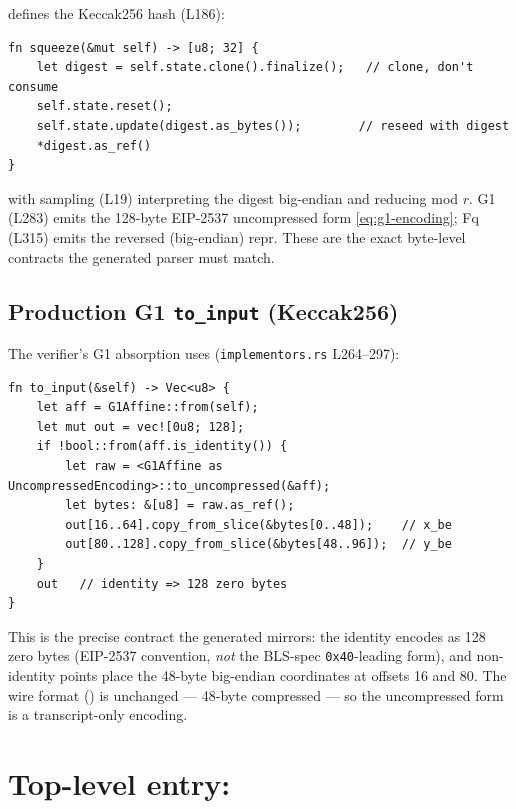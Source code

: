  defines the Keccak256 hash (L186):
\begin{lstlisting}[style=rust]
fn squeeze(&mut self) -> [u8; 32] {
    let digest = self.state.clone().finalize();   // clone, don't consume
    self.state.reset();
    self.state.update(digest.as_bytes());        // reseed with digest
    *digest.as_ref()
}
\end{lstlisting}
with sampling  (L19) interpreting
the digest big-endian and reducing mod $r$. G1  (L283)
emits the 128-byte EIP-2537 uncompressed form \eqref{eq:g1-encoding};
Fq  (L315) emits the reversed (big-endian) repr. These
are the exact byte-level contracts the generated parser must match.

\subsection{Production G1 \texttt{to\_input} (Keccak256)}
\label{sec:rust-to-input}

The verifier's G1 absorption uses
(\texttt{implementors.rs} L264--297):
\begin{lstlisting}[style=rust]
fn to_input(&self) -> Vec<u8> {
    let aff = G1Affine::from(self);
    let mut out = vec![0u8; 128];
    if !bool::from(aff.is_identity()) {
        let raw = <G1Affine as UncompressedEncoding>::to_uncompressed(&aff);
        let bytes: &[u8] = raw.as_ref();
        out[16..64].copy_from_slice(&bytes[0..48]);    // x_be
        out[80..128].copy_from_slice(&bytes[48..96]);  // y_be
    }
    out   // identity => 128 zero bytes
}
\end{lstlisting}
This is the precise contract the generated
 mirrors: the identity
encodes as 128 zero bytes (EIP-2537 convention, \emph{not} the BLS-spec
\texttt{0x40}-leading form), and non-identity points place the 48-byte
big-endian coordinates at offsets 16 and 80. The wire format
() is unchanged --- 48-byte compressed --- so the
uncompressed form is a transcript-only encoding.

\section{Top-level entry: }
\label{sec:rust-prepare}

